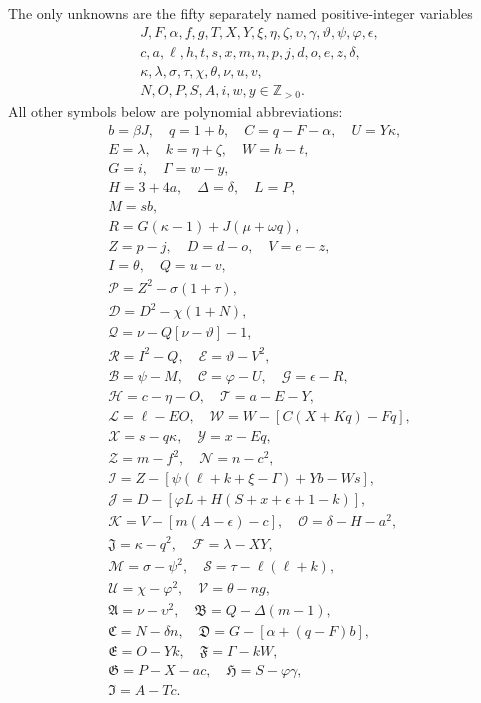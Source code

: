 The only unknowns are the fifty separately named positive-integer variables
\[
\begin{gathered}J,F,\alpha,f,g,T,X,Y,\xi,\eta,\zeta,\upsilon,\gamma,\vartheta,\psi,\varphi,\epsilon,\\
c,a,\ell,h,t,s,x,m,n,p,j,d,o,e,z,\delta,\\
\kappa,\lambda,\sigma,\tau,\chi,\theta,\nu,u,v,\\
N,O,P,S,A,i,w,y\in\mathbb Z_{>0}.\end{gathered}
\]
All other symbols below are polynomial abbreviations:
\[
\begin{gathered}
b=\beta J,\quad q=1+b,\quad C=q-F-\alpha,\quad U=Y\kappa,\\
E=\lambda,\quad k=\eta+\zeta,\quad W=h-t,\\
G=i,\quad\Gamma=w-y,\\
H=3+4a,\quad\Delta=\delta,\quad L=P,\\
M=sb,\\
R=G(\kappa-1)+J(\mu+\omega q),\\
Z=p-j,\quad D=d-o,\quad V=e-z,\\
I=\theta,\quad Q=u-v,\\
\mathcal{P}=Z^2-\sigma(1+\tau),\\
\mathcal{D}=D^2-\chi(1+N),\\
\mathcal{Q}=\nu-Q[\nu-\vartheta]-1,\\
\mathcal{R}=I^2-Q,\quad \mathcal{E}=\vartheta-V^2,\\
\mathcal{B}=\psi-M,\quad \mathcal{C}=\varphi-U,\quad \mathcal{G}=\epsilon-R,\\
\mathcal{H}=c-\eta-O,\quad \mathcal{T}=a-E-Y,\\
\mathcal{L}=\ell-EO,\quad \mathcal{W}=W-[C(X+Kq)-Fq],\\
\mathcal{X}=s-q\kappa,\quad \mathcal{Y}=x-Eq,\\
\mathcal{Z}=m-f^2,\quad \mathcal{N}=n-c^2,\\
\mathcal{I}=Z-[\psi(\ell+k+\xi-\Gamma)+Yb-Ws],\\
\mathcal{J}=D-[\varphi L+H(S+x+\epsilon+1-k)],\\
\mathcal{K}=V-[m(A-\epsilon)-c],\quad\mathcal{O}=\delta-H-a^2,\\
\mathfrak{J}=\kappa-q^2,\quad\mathcal{F}=\lambda-XY,\\
\mathcal{M}=\sigma-\psi^2,\quad\mathcal{S}=\tau-\ell(\ell+k),\\
\mathcal{U}=\chi-\varphi^2,\quad\mathcal{V}=\theta-ng,\\
\mathfrak{A}=\nu-\upsilon^2,\quad\mathfrak{B}=Q-\Delta(m-1),\\
\mathfrak{C}=N-\delta n,\quad\mathfrak{D}=G-[\alpha+(q-F)b],\\
\mathfrak{E}=O-Yk,\quad\mathfrak{F}=\Gamma-kW,\\
\mathfrak{G}=P-X-ac,\quad\mathfrak{H}=S-\varphi\gamma,\\
\mathfrak{I}=A-Tc.
\end{gathered}
\]
